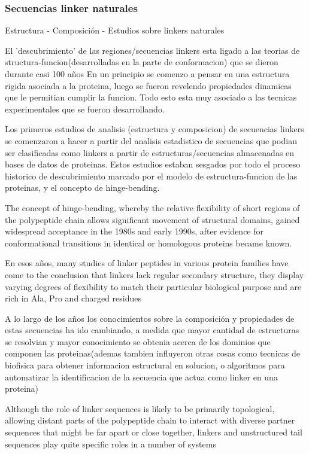 \subsubsection{Secuencias linker naturales}
Estructura - Composición -  Estudios sobre linkers naturales


El 'descubrimiento' de las regiones/secuencias linkers esta ligado a las teorias de structura-funcion(desarrolladas en la parte de conformacion) que se dieron durante casi 100 años
En un principio se comenzo a pensar en una estructura rigida asociada a la proteina, luego se fueron revelendo propiedades dinamicas que le permitian cumplir la funcion. 
Todo esto esta muy asociado a las tecnicas experimentales que se fueron desarrollando.

Los primeros estudios de analisis (estructura y composicion) de secuencias linkers se comenzaron a hacer a partir del analisis estadistico de secuencias que podian ser clasificadas como linkers a partir de estructuras/secuencias almacenadas en bases de datos de proteinas.
Estos estudios estaban sesgados por todo el proceso historico de descubrimiento marcado por el modelo de estructura-funcion de las proteinas, y el concepto de hinge-bending.

The concept of hinge-bending, whereby the relative flexibility of short regions of the polypeptide chain allows significant movement of structural domains, gained widespread acceptance in
the 1980s and early 1990s, after evidence for conformational transitions in identical or homologous proteins became known.


En esos años, many studies of linker peptides in various protein families have come to the conclusion that linkers lack regular secondary structure, they display varying degrees of flexibility to match their particular biological purpose and are rich in Ala, Pro and charged residues

A lo largo de los años los conocimientos sobre la composición y propiedades de estas secuencias ha ido cambiando, 
a medida que mayor cantidad de estructuras se resolvian y mayor conocimiento se obtenia acerca de los dominios que componen las proteinas(ademas tambien influyeron otras cosas como tecnicas de biofisica para obtener informacion estructural en solucion, o algoritmos para automatizar la identificacion de la secuencia que actua como linker en una proteina)

Although the role of linker sequences is likely to be primarily topological, allowing distant parts of the polypeptide chain to interact with diverse partner sequences that might be far apart or close together, linkers and unstructured tail sequences play quite specific roles in a
number of systems

